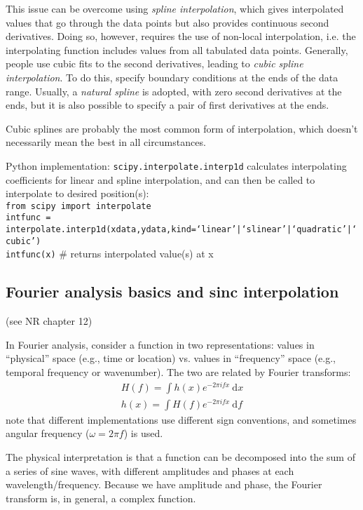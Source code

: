 \documentclass[12pt]{article}
\begin{document}
This issue can be overcome using \emph{spline interpolation}, which gives
interpolated values that go through the data points but also provides continuous
second derivatives. Doing so, however, requires the use of non-local interpolation,
i.e. the interpolating function includes values from all tabulated data points.
Generally, people use cubic fits to the second derivatives, leading to
\emph{cubic spline interpolation}. To do this, specify boundary conditions at
the ends of the data range. Usually, a \emph{natural spline} is adopted, with
zero second derivatives at the ends, but it is also possible to specify a pair
of first derivatives at the ends.

Cubic splines are probably the most common form of interpolation, which doesn't
necessarily mean the best in all circumstances.

Python implementation: \texttt{scipy.interpolate.interp1d} calculates
interpolating coefficients for linear and spline interpolation, and can then
be called to interpolate to desired position(s): \\

\noindent\texttt{from scipy import interpolate \\
intfunc = interpolate.interp1d(xdata,ydata,kind=`linear'|`slinear'|`quadratic'|`cubic') \\
intfunc(x)} $\#$ returns interpolated value(s) at x  \\

\subsection{Fourier analysis basics and sinc interpolation}
(see NR chapter 12)

In Fourier analysis, consider a function in two representations: values in
``physical'' space (e.g., time or location) vs. values in ``frequency'' space
(e.g., temporal frequency or wavenumber). The two are related by Fourier
transforms:
\begin{align*}
    H(f) = \int \! h(x)e^{-2 \pi i f x} \ \textrm{d}x \\
    h(x) = \int \! H(f)e^{-2 \pi i f x} \ \textrm{d}f
\end{align*}
note that different implementations use different sign conventions, and
sometimes angular frequency ($\omega = 2\pi f$) is used.

The physical interpretation is that a function can be decomposed into the sum
of a series of sine waves, with different amplitudes and phases at each
wavelength/frequency. Because we have amplitude and phase, the Fourier
transform is, in general, a complex function.
\end{document}
